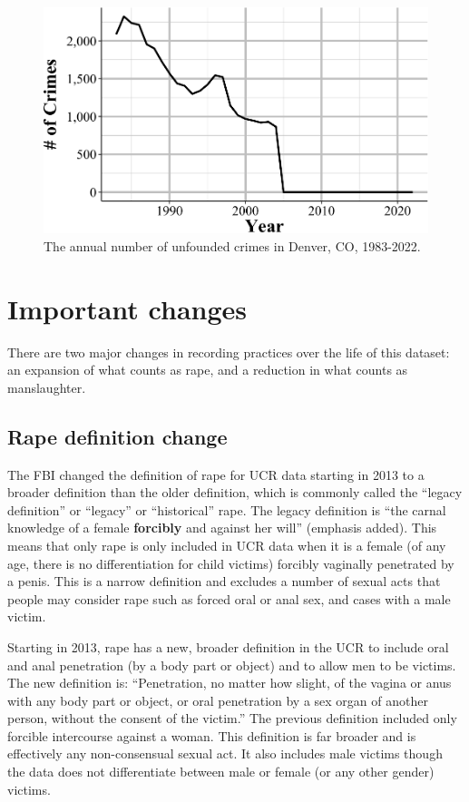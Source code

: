 \documentclass[
  12pt,
  openany]{book}
\begin{document}
\begin{figure}

{\centering \includegraphics[width=0.9\linewidth]{03_offenses_known_files/figure-latex/denverUnfounded-1} 

}

\caption{The annual number of unfounded crimes in Denver, CO, 1983-2022.}\label{fig:denverUnfounded}
\end{figure}

\section{Important changes}\label{important-changes}

There are two major changes in recording practices over the life of this dataset: an expansion of what counts as rape, and a reduction in what counts as manslaughter.

\subsection{Rape definition change}\label{rape-definition-change}

The FBI changed the definition of rape for UCR data starting in 2013 to a broader definition than the older definition, which is commonly called the ``legacy definition'' or ``legacy'' or ``historical'' rape. The legacy definition is ``the carnal knowledge of a female \textbf{forcibly} and against her will'' (emphasis added). This means that only rape is only included in UCR data when it is a female (of any age, there is no differentiation for child victims) forcibly vaginally penetrated by a penis. This is a narrow definition and excludes a number of sexual acts that people may consider rape such as forced oral or anal sex, and cases with a male victim.

Starting in 2013, rape has a new, broader definition in the UCR to include oral and anal penetration (by a body part or object) and to allow men to be victims. The new definition is: ``Penetration, no matter how slight, of the vagina or anus with any body part or object, or oral penetration by a sex organ of another person, without the consent of the victim.'' The previous definition included only forcible intercourse against a woman. This definition is far broader and is effectively any non-consensual sexual act. It also includes male victims though the data does not differentiate between male or female (or any other gender) victims.
\end{document}
